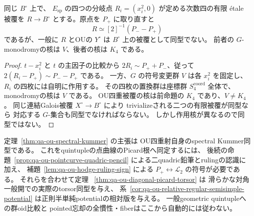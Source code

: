 \begin{proposition}[分岐点の四重射は別のtorsorである]
\label{prop:qa-ou-spectral-branch-not-sign}
同じ $B^\circ$ 上で、
$E_{\mathrm{sp}}$ の四つの分岐点
$R_i=(x_i^2,0)$ が定める次数四の有限 étale 被覆を
$R\to B^\circ$ とする。原点を $P_+$ に取り直すと
\[
 R\simeq [2]^{-1}(P_--P_+)
\]
であるが、一般に $R$ とOUの $Y^\circ$ は
$B^\circ$ 上の被覆として同型でない。
前者の $G$-monodromyの核は $V$、後者の核は $K_4$ である。
\end{proposition}
\begin{proof}
$t-x_i^2$ と $t$ の主因子の比較から
$2R_i\sim P_++P_-$、従って
$2(R_i-P_+)\sim P_--P_+$ である。
一方、$G$ の符号変更群 $V$ は各 $x_i^2$ を固定し、
$R_i$ の四枚には自明に作用する。
その四枚の置換群は座標群 $S_4^{\mathrm{coord}}$ 全体で、
monodromyの核は $V$ である。
OU四重被覆の核は前命題の $K_4$ であり、$V\ne K_4$。
同じ連結Galois被覆 $X^\circ\to B^\circ$ により
trivializeされる二つの有限被覆が同型なら
対応する $G$-集合も同型でなければならない。
しかし作用核が異なるので同型ではない。
\end{proof}
\begin{remark}
\label{rem:qa-ou-spectral-vs-quintuple}
定理~\ref{thm:qa-ou-spectral-kummer} の主張は
OU四重射自身のspectral Kummer同型である。
これをquintupleの点曲線のPicard根へ同定するには、
後続の命題~\ref{prop:qa-ou-pointcurve-quadric-pencil}
による二quadric鉛筆とrulingの認識に加え、
補題~\ref{lem:qa-ou-hodge-ruling-sign} による
$P_+\leftrightarrow\mathcal L_2$ の符号が必要である。
それらを合わせて定理
~\ref{thm:qa-ou-diagonal-picard-torsor} は
滑らかな対角一般開での実際のtorsor同型を与え、
系~\ref{cor:qa-ou-relative-regular-semisimple-potential}
は正則半単純potentialの相対版を与える。
一般geometric quintupleへの群oid比較と
pointed忘却の全慣性・fiberはここから自動的には従わない。
\end{remark}


